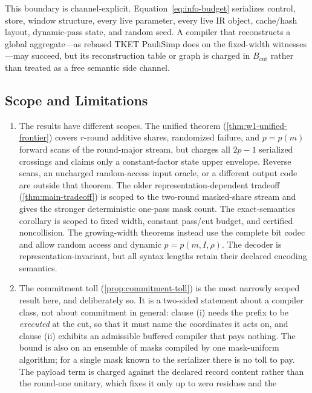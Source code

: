 \documentclass[a4paper,twocolumn,10pt,unpublished]{quantumarticle}
\begin{document}
This boundary is channel-explicit.  Equation~\eqref{eq:info-budget}
serializes control, store, window structure, every live parameter, every
live IR object, cache/hash layout, dynamic-pass state, and random seed.  A
compiler that reconstructs a global aggregate---as
rebased TKET PauliSimp does on the fixed-width witnesses---may succeed, but
its reconstruction table or graph is charged in $B_{\mathrm{cut}}$ rather
than treated as a free semantic side channel.

\subsection{Scope and Limitations}

\begin{enumerate}[leftmargin=1.5em]
    \item The results have different scopes.  The unified theorem
    (\cref{thm:w1-unified-frontier}) covers $r$-round additive shares,
    randomized failure, and $p=p(m)$ forward scans of the round-major
    stream, but charges all $2p-1$ serialized crossings and claims only a
    constant-factor state upper envelope.  Reverse scans, an uncharged
    random-access input oracle, or a different output code are outside that
    theorem.  The older representation-dependent tradeoff
    (\cref{thm:main-tradeoff}) is scoped to the two-round masked-share
    stream and gives the stronger deterministic one-pass mask count.  The
    exact-semantics corollary is scoped to fixed width, constant pass/cut
    budget, and certified noncollision.  The growing-width theorems instead
    use the complete bit codec and allow random access and dynamic
    $p=p(m,I,\rho)$.  The decoder is representation-invariant, but all
    syntax lengths retain their declared encoding semantics.
    \item The commitment toll (\cref{prop:commitment-toll}) is the most
    narrowly scoped result here, and deliberately so.  It is a
    two-sided statement about a compiler class, not about commitment in
    general: clause (i) needs the prefix to be \emph{executed} at the
    cut, so that it must name the coordinates it acts on, and clause
    (ii) exhibits an admissible buffered compiler that pays nothing.
    The bound is also on an ensemble of masks compiled by one
    mask-uniform algorithm; for a single mask known to the serializer
    there is no toll to pay.  The payload term is charged against the
    declared record content rather than the round-one unitary, which
    fixes it only up to zero residues and the

\end{enumerate}
\end{document}
